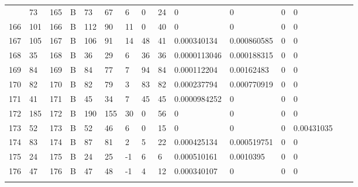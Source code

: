 \begin{longtable}{lllllllllllllll}
\begin{comment}
	165 & 73                & 165 & B   & 73                & 67                & 6                 & 0    & 24         & 0              & 0              & 0             & 0            \\
	166 & 101               & 166 & B   & 112               & 90                & 11                & 0    & 40         & 0              & 0              & 0             & 0            \\
	167 & 105               & 167 & B   & 106               & 91                & 14                & 48   & 41         & 0.000340134    & 0.000860585    & 0             & 0            \\
	168 & 35                & 168 & B   & 36                & 29                & 6                 & 36   & 36         & 0.0000113046   & 0.000188315    & 0             & 0            \\
	169 & 84                & 169 & B   & 84                & 77                & 7                 & 94   & 84         & 0.000112204    & 0.00162483     & 0             & 0            \\
	170 & 82                & 170 & B   & 82                & 79                & 3                 & 83   & 82         & 0.000237794    & 0.000770919    & 0             & 0            \\
	171 & 41                & 171 & B   & 45                & 34                & 7                 & 45   & 45         & 0.0000984252   & 0              & 0             & 0            \\
	172 & 185               & 172 & B   & 190               & 155               & 30                & 0    & 56         & 0              & 0              & 0             & 0            \\
	173 & 52                & 173 & B   & 52                & 46                & 6                 & 0    & 15         & 0              & 0              & 0             & 0.00431035   \\
	174 & 83                & 174 & B   & 87                & 81                & 2                 & 5    & 22         & 0.000425134    & 0.000519751    & 0             & 0            \\
	175 & 24                & 175 & B   & 24                & 25                & -1                & 6    & 6          & 0.000510161    & 0.0010395      & 0             & 0            \\
	176 & 47                & 176 & B   & 47                & 48                & -1                & 4    & 12         & 0.000340107    & 0              & 0             & 0            \\

\end{comment}
\end{longtable}

